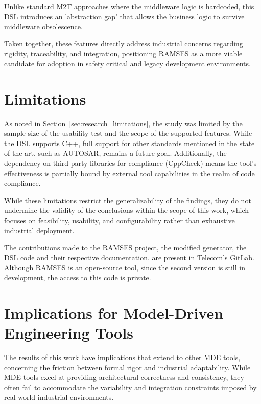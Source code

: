 Unlike standard \gls{M2T} approaches where the middleware logic is hardcoded, this \gls{DSL} introduces an 'abstraction gap' that allows the business logic to survive middleware obsolescence.

Taken together, these features directly address industrial concerns regarding rigidity, traceability, and integration, positioning \gls{RAMSES} as a more viable candidate for adoption in safety critical and legacy development environments.


\section{Limitations}
\label{sec:limitations}

As noted in Section~\ref{sec:research_limitations}, the study was limited by the sample size of the usability test and the scope of the supported features. While the \gls{DSL} supports C++, full support for other standards mentioned in the state of the art, such as \gls{AUTOSAR}, remains a future goal. Additionally, the dependency on third-party libraries for compliance (CppCheck) means the tool's effectiveness is partially bound by external tool capabilities in the realm of code compliance.

While these limitations restrict the generalizability of the findings, they do not undermine the validity of the conclusions within the scope of this work, which focuses on feasibility, usability, and configurability rather than exhaustive industrial deployment.

The contributions made to the \gls{RAMSES} project, the modified generator, the \gls{DSL} code and their respective documentation, are present in Telecom's GitLab. Although \gls{RAMSES} is an open-source tool, since the second version is still in development, the access to this code is private.


\section{Implications for Model-Driven Engineering Tools}
\label{sec:implications}

The results of this work have implications that extend to other \gls{MDE} tools, concerning the friction between formal rigor and industrial adaptability. While \gls{MDE} tools excel at providing architectural correctness and consistency, they often fail to accommodate the variability and integration constraints imposed by real-world industrial environments.

